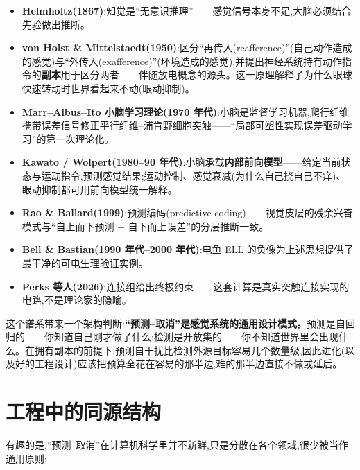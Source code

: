 \documentclass[UTF8,12pt,a4paper]{ctexart}
\begin{document}
\begin{itemize}
  \item \textbf{Helmholtz(1867)}:知觉是``无意识推理''——感觉信号本身不足,大脑必须结合先验做出推断。
  \item \textbf{von Holst \& Mittelstaedt(1950)}\cite{vonholst1950}:区分``再传入(reafference)''(自己动作造成的感觉)与``外传入(exafference)''(环境造成的感觉),并提出神经系统持有动作指令的\textbf{副本}用于区分两者——伴随放电概念的源头。这一原理解释了为什么眼球快速转动时世界看起来不动(眼动抑制)。
  \item \textbf{Marr--Albus--Ito 小脑学习理论(1970 年代)}\cite{marr1969,albus1971,ito1982}:小脑是监督学习机器,爬行纤维携带误差信号修正平行纤维--浦肯野细胞突触——``局部可塑性实现误差驱动学习''的第一次理论化。
  \item \textbf{Kawato / Wolpert(1980--90 年代)}\cite{kawato1992,wolpert2000}:小脑承载\textbf{内部前向模型}——给定当前状态与运动指令,预测感觉结果;运动控制、感觉衰减(为什么自己挠自己不痒)、眼动抑制都可用前向模型统一解释。
  \item \textbf{Rao \& Ballard(1999)}\cite{raoballard1999}:预测编码(predictive coding)——视觉皮层的残余兴奋模式与``自上而下预测 + 自下而上误差''的分层推断一致。
  \item \textbf{Bell \& Bastian(1990 年代--2000 年代)}\cite{bell1981,bastian1986}:电鱼 ELL 的负像为上述思想提供了最干净的可电生理验证实例。
  \item \textbf{Perks 等人(2026)}\cite{perks2026}:连接组给出终极约束——这套计算是真实突触连接实现的电路,不是理论家的隐喻。
\end{itemize}

这个谱系带来一个架构判断:\textbf{``预测--取消''是感觉系统的通用设计模式。}预测是自回归的——你知道自己刚才做了什么;检测是开放集的——你不知道世界里会出现什么。在拥有副本的前提下,预测自干扰比检测外源目标容易几个数量级,因此进化(以及好的工程设计)应该把预算全花在容易的那半边,难的那半边直接不做或延后。

\section{工程中的同源结构}

有趣的是,``预测--取消''在计算机科学里并不新鲜,只是分散在各个领域,很少被当作通用原则:
\end{document}
